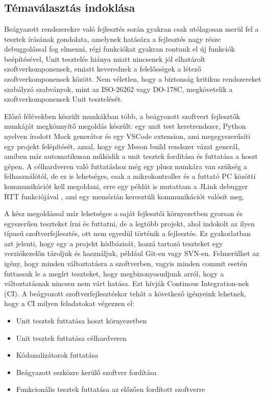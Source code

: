 \chapter{\bevezetes}

\section*{Témaválasztás indoklása}

Beágyazott rendszerekre való fejlesztés során gyakran csak utólagosan merül fel a tesztek írásának gondolata, amelynek hatására a fejlesztés nagy része debuggolással fog elmenni, régi funkciókat gyakran rontunk el új funkciók beépítésével, Unit tesztelés hiánya miatt nincsenek jól elhatárolt szoftverkomponensek, emiatt keverednek a felelősségek a létező szoftverkomponensek között. Nem véletlen, hogy a biztonság kritikus rendszereket szabályzó szabványok, mint az ISO-26262 vagy DO-178C, megkövetelik a szoftverkomponensek Unit tesztelését. \cite{Szakdolgozat} 

Előző félévekben készült munkákban több, a beágyozott szoftvert fejlesztők munkáját megkönnyítő megoldás készült: egy unit test keretrendszer, Python nyelven írodott Mock generátor és egy VSCode extension, ami megegyszerűsíti egy projekt felépítését, azzal, hogy egy Meson build rendszer vázat generál, amiben már automatikusan működik a unit tesztek fordítása és futtatása a hoszt gépen. A célhardveren való futtatáshoz még egy plusz munkára van szükség a felhasználótól, de ez is lehetséges, csak a mikrokontroller és a futtató PC közötti kommunikációt kell megoldani, erre egy példát is mutattam a JLink debugger RTT funkciójával \cite{SeggerRTT}, ami egy memórián keresztüli kommunikációt valósít meg.

A kész megoldással már lehetséges a saját fejlesztői környezetben gyorsan és egyszerűen teszteket írni és futtatni, de a legtöbb projekt, ahol indokolt az ilyen típusú szoftverfejlesztés, ott nem egyedül történik a fejlesztés. Ez gyakorlatban azt jelenti, hogy egy a projekt kódbázisát, hozzá tartozó teszteket egy verziókezelőn tároljuk és használjuk, például Git-en vagy SVN-en. Felmerülhet az igény, hogy minden változtatásra a szoftverben, vagyis minden commit esetén futtassuk le a megírt teszteket, hogy megbizonyosudjunk arról, hogy a változtatásnak nincsen nem várt hatása. Ezt hívják Continous Integration-nek (CI). A beágyozott szoftverfejlesztéskor tehát a következő igényeink lehetnek, hogy a CI milyen feladatokat végezzen el:
\begin{itemize}
	\item Unit tesztek futtatása hoszt környezetben
	\item Unit tesztek futtatása célhardveren
	\item Kódanalizátorok futtatása
	\item Beágyazott eszközre kerülő szoftver fordítása
	\item Funkcionális tesztek futtatása az előzően fordított szoftverre 
\end{itemize}

